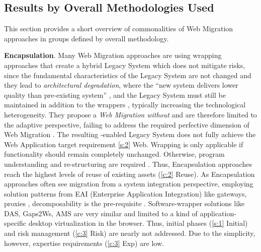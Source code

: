 \vspace{-10pt}
\hypertarget{sec:sota.discussion.methodologies}{%
\subsection{Results by Overall Methodologies Used}\label{sec:sota.discussion.methodologies}}
\vspace{10pt}

This section provides a short overview of commonalities of \gls{Web Migration} approaches in groups defined by overall methodology.

\textbf{Encapsulation}. Many \gls{Web Migration} approaches are using wrapping approaches that create a hybrid \gls{Legacy System} which does not mitigate  risks, since the fundamental characteristics of the \gls{Legacy System} are not changed \autocite{Almonaies2010SOAStrategies} and they lead to \emph{architectural degradation}, where the ``new system delivers lower quality than pre-existing system'' \autocite{Razavian2010SAPIENSA}, and the \gls{Legacy System} must still be maintained in addition to the wrappers \autocite{Fuhr2013SOAMIG}, typically increasing the technological heterogeneity.
They propose a \emph{\gls{Web Migration} without } and are therefore limited to the adaptive perspective, failing to address the required perfective dimension of \gls{Web Migration} \autocite{ISO/IEEE2006SoftwareLifeCycle}.
The resulting -enabled \gls{Legacy System} does not fully achieve the \gls{Web Application} target requirement \cref{s:2} Web.
Wrapping is only applicable if  functionality should remain completely unchanged. Otherwise, program understanding and re-structuring are required \autocite{Stroulia2002}.
Thus, \gls{Encapsulation} approaches reach the highest levels of reuse of existing assets (\cref{c:2} Reuse).
As \gls{Encapsulation} approaches often see migration from a system integration perspective, employing solution patterns from EAI (Enterprise Application Integration) like gateways, proxies \autocite{Karampaglis2014,Bodhuin2003}, decomposability is the pre-requisite \autocite{Wagner2014,Khadka2016PHD,Khadka2013SurveySOAMigration,Lucia2008,Lucia2006}.
Software-wrapper solutions like DAS, Gaps2Ws, AMS are very similar and limited to a kind of application-specific desktop virtualization in the browser.
Thus, initial phases (\cref{s:1} Initial) and \gls{risk management} (\cref{c:3} Risk) are nearly not addressed.
Due to the simplicity, however, expertise requirements (\cref{c:3} Exp) are low.

